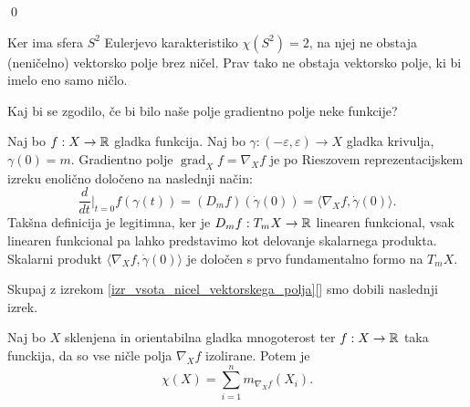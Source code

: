 \qed

\begin{primer}
    Ker ima sfera $S^2$ Eulerjevo karakteristiko $\chi(S^2) = 2$, na njej ne obstaja (neničelno) vektorsko polje brez ničel. Prav tako ne obstaja vektorsko polje, ki bi imelo eno samo ničlo.
    \end{primer}


Kaj bi se zgodilo, če bi bilo naše polje gradientno polje neke funkcije?

\begin{definicija}
\label{def_gradientno_polje}
Naj bo $f: X \to  \mathbb{R} $ gladka funkcija. Naj bo $\gamma: (-\varepsilon, \varepsilon) \to  X$ gladka krivulja, $\gamma(0) = m$. Gradientno polje $\operatorname{grad}_X f = \nabla_X f$ je po Rieszovem reprezentacijskem izreku enolično določeno na naslednji način:
\[ \frac{d}{dt} \bigg|_{t = 0} f(\gamma(t)) = (D_mf)(\dot{\gamma}(0)) = \langle \nabla_X f, \dot{\gamma}(0) \rangle. \]  
Takšna definicija je legitimna, ker je $D_mf: T_mX \to  \mathbb{R} $ linearen funkcional, vsak linearen funkcional pa lahko predstavimo kot delovanje skalarnega produkta. Skalarni produkt $\langle \nabla_X f, \dot{\gamma}(0) \rangle$ je določen s prvo fundamentalno formo na $T_mX$.
\end{definicija}

Skupaj z izrekom \ref{izr_vsota_nicel_vektorskega_polja}[] smo dobili naslednji izrek.
\begin{izrek}
\label{izr_vsota_nicel_gradientnih_polj}
 Naj bo $X$ sklenjena in orientabilna gladka mnogoterost ter $f: X \to  \mathbb{R} $ taka funckija, da so vse ničle polja $\nabla_X f$ izolirane. Potem je \begin{equation*}
 \chi(X) = \sum_{i = 1}^{n} m_{\nabla_X f} (X_i).
 \end{equation*}  
\end{izrek}

